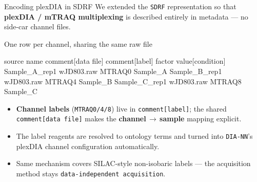 \documentclass[aspectratio=169,11pt]{beamer}
\newcommand{\diann}{\texttt{DIA-NN}}
\newcommand{\sdrf}{\texttt{SDRF}}
\begin{document}
\begin{frame}[fragile]{Encoding plexDIA in SDRF}
  We extended the \sdrf{} representation so that \textbf{plexDIA / mTRAQ
  multiplexing} is described entirely in metadata --- no side-car channel
  files.
  \vspace{0.3em}
  \begin{block}{One row per channel, sharing the same raw file}
    \begin{semiverbatim}\scriptsize
source name      comment[data file]  comment[label]  factor value[condition]
Sample_A_rep1    wJD803.raw          \textcolor{qmblue}{MTRAQ0}          Sample_A
Sample_B_rep1    wJD803.raw          \textcolor{qmblue}{MTRAQ4}          Sample_B
Sample_C_rep1    wJD803.raw          \textcolor{qmblue}{MTRAQ8}          Sample_C
    \end{semiverbatim}
  \end{block}
  \begin{itemize}\small
    \item \textbf{Channel labels} (\texttt{MTRAQ0/4/8}) live in
          \texttt{comment[label]}; the shared \texttt{comment[data file]}
          makes the \textbf{channel\,$\rightarrow$\,sample} mapping explicit.
    \item The label reagents are resolved to ontology terms and turned into
          \diann{}'s plexDIA channel configuration automatically.
    \item Same mechanism covers SILAC-style non-isobaric labels --- the
          acquisition method stays \texttt{data-independent acquisition}.
  \end{itemize}
\end{frame}
\end{document}

